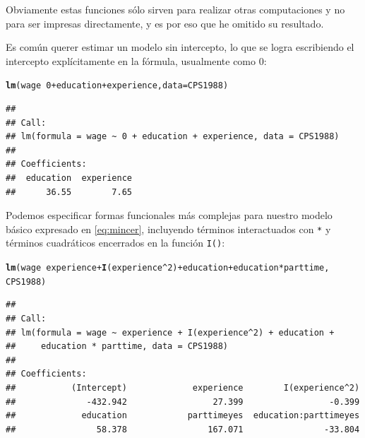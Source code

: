 \documentclass{article}\usepackage[]{graphicx}\usepackage[]{color}
\makeatletter
\newcommand{\hlnum}[1]{\textcolor[rgb]{0.686,0.059,0.569}{#1}}%
\newcommand{\hlopt}[1]{\textcolor[rgb]{0,0,0}{#1}}%
\newcommand{\hlstd}[1]{\textcolor[rgb]{0.345,0.345,0.345}{#1}}%
\newcommand{\hlkwc}[1]{\textcolor[rgb]{0.333,0.667,0.333}{#1}}%
\newcommand{\hlkwd}[1]{\textcolor[rgb]{0.737,0.353,0.396}{\textbf{#1}}}%
\newenvironment{kframe}{%
 \def\at@end@of@kframe{}%
 \ifinner\ifhmode%
  \def\at@end@of@kframe{\end{minipage}}%
  \begin{minipage}{\columnwidth}%
 \fi\fi%
 \def\FrameCommand##1{\hskip\@totalleftmargin \hskip-\fboxsep
 \colorbox{shadecolor}{##1}\hskip-\fboxsep
     \hskip-\linewidth \hskip-\@totalleftmargin \hskip\columnwidth}%
 \MakeFramed {\advance\hsize-\width
   \@totalleftmargin\z@ \linewidth\hsize
   \@setminipage}}%
 {\par\unskip\endMakeFramed%
 \at@end@of@kframe}
\newenvironment{knitrout}{}{} %
\makeatother
\begin{document}
Obviamente estas funciones sólo sirven para realizar otras computaciones y no para ser impresas directamente, y es por eso que he omitido su resultado.

Es común querer estimar un modelo sin intercepto, lo que se logra escribiendo el intercepto explícitamente en la fórmula, usualmente como 0:

\begin{knitrout}
\color{fgcolor}\begin{kframe}
\begin{alltt}
\hlkwd{lm}\hlstd{(wage} \hlopt{~} \hlnum{0} \hlopt{+} \hlstd{education} \hlopt{+} \hlstd{experience,} \hlkwc{data} \hlstd{= CPS1988)}
\end{alltt}
\begin{verbatim}
## 
## Call:
## lm(formula = wage ~ 0 + education + experience, data = CPS1988)
## 
## Coefficients:
##  education  experience  
##      36.55        7.65
\end{verbatim}
\end{kframe}
\end{knitrout}

Podemos especificar formas funcionales más complejas para nuestro modelo básico expresado en \eqref{eq:mincer}, incluyendo términos interactuados con \verb|*| y términos cuadráticos encerrados en la función \verb|I()|:

\begin{knitrout}
\color{fgcolor}\begin{kframe}
\begin{alltt}
\hlkwd{lm}\hlstd{(wage} \hlopt{~} \hlstd{experience} \hlopt{+} \hlkwd{I}\hlstd{(experience}\hlopt{^}\hlnum{2}\hlstd{)} \hlopt{+} \hlstd{education} \hlopt{+} \hlstd{education}\hlopt{*}\hlstd{parttime,}
   \hlstd{CPS1988)}
\end{alltt}
\begin{verbatim}
## 
## Call:
## lm(formula = wage ~ experience + I(experience^2) + education + 
##     education * parttime, data = CPS1988)
## 
## Coefficients:
##           (Intercept)             experience        I(experience^2)  
##              -432.942                 27.399                 -0.399  
##             education            parttimeyes  education:parttimeyes  
##                58.378                167.071                -33.804
\end{verbatim}
\end{kframe}
\end{knitrout}
\end{document}

